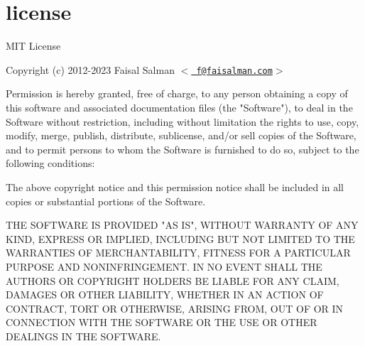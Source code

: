 \chapter{license}
\hypertarget{md__d_1_2_g_i_t_2_food_link_2foodlink_8client_2node__modules_2karma_2node__modules_2ua-parser-js_2license}{}\label{md__d_1_2_g_i_t_2_food_link_2foodlink_8client_2node__modules_2karma_2node__modules_2ua-parser-js_2license}
MIT License

Copyright (c) 2012-\/2023 Faisal Salman \texorpdfstring{$<$}{<}\href{mailto:f@faisalman.com}{\texttt{ f@faisalman.\+com}}\texorpdfstring{$>$}{>}

Permission is hereby granted, free of charge, to any person obtaining a copy of this software and associated documentation files (the "{}\+Software"{}), to deal in the Software without restriction, including without limitation the rights to use, copy, modify, merge, publish, distribute, sublicense, and/or sell copies of the Software, and to permit persons to whom the Software is furnished to do so, subject to the following conditions\+:

The above copyright notice and this permission notice shall be included in all copies or substantial portions of the Software.

THE SOFTWARE IS PROVIDED "{}\+AS IS"{}, WITHOUT WARRANTY OF ANY KIND, EXPRESS OR IMPLIED, INCLUDING BUT NOT LIMITED TO THE WARRANTIES OF MERCHANTABILITY, FITNESS FOR A PARTICULAR PURPOSE AND NONINFRINGEMENT. IN NO EVENT SHALL THE AUTHORS OR COPYRIGHT HOLDERS BE LIABLE FOR ANY CLAIM, DAMAGES OR OTHER LIABILITY, WHETHER IN AN ACTION OF CONTRACT, TORT OR OTHERWISE, ARISING FROM, OUT OF OR IN CONNECTION WITH THE SOFTWARE OR THE USE OR OTHER DEALINGS IN THE SOFTWARE. 